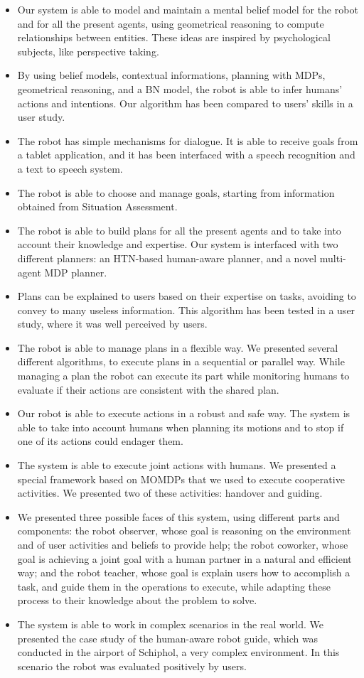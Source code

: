 \begin{itemize}
\item Our system is able to model and maintain a mental belief model for the robot and for all the present agents, using geometrical reasoning to compute relationships between entities. These ideas are inspired by psychological subjects, like perspective taking.
\item By using belief models, contextual informations, planning with MDPs,  geometrical reasoning, and a BN model, the robot is able to infer humans' actions and intentions. Our algorithm has been compared to users' skills in a user study.
\item The robot has simple mechanisms for dialogue. It is able to receive goals from a tablet application, and it has been interfaced with a speech recognition and a text to speech system.
\item The robot is able to choose and manage goals, starting from information obtained from Situation Assessment.
\item The robot is able to build plans for all the present agents and to take into account their knowledge and expertise. Our system is interfaced with two different planners: an HTN-based human-aware planner, and a novel multi-agent MDP planner.
\item Plans can be explained to users based on their expertise on tasks, avoiding to convey to many useless information. This algorithm has been tested in a user study, where it was well perceived by users.
\item The robot is able to manage plans in a flexible way. We presented several different algorithms, to execute plans in a sequential or parallel way. While managing a plan the robot can execute its part while monitoring humans to evaluate if their actions are consistent with the shared plan.
\item Our robot is able to execute actions in a robust and safe way. The system is able to take into account humans when planning its motions and to stop if one of its actions could endager them.
\item The system is able to execute joint actions with humans. We presented a special framework based on MOMDPs that we used to execute cooperative activities. We presented two of these activities: handover and guiding.
\item We presented three possible faces of this system, using different parts and components: the robot observer, whose goal is reasoning on the environment and of user activities and beliefs to provide help; the robot coworker, whose goal is achieving a joint goal with a human partner in a natural and efficient way; and the robot teacher, whose goal is explain users how to accomplish a task, and guide them in the operations to execute, while adapting these process to their knowledge about the problem to solve. 
\item The system is able to work in complex scenarios in the real world. We presented the case study of the human-aware robot guide, which was conducted in the airport of Schiphol, a very complex environment. In this scenario the robot was evaluated positively by users.
\end{itemize}


